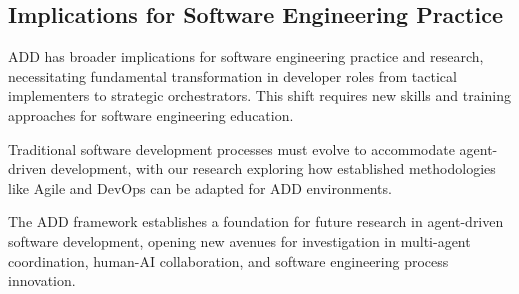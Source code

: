 \subsection{Implications for Software Engineering Practice}

ADD has broader implications for software engineering practice and research, necessitating fundamental transformation in developer roles from tactical implementers to strategic orchestrators. This shift requires new skills and training approaches for software engineering education.

Traditional software development processes must evolve to accommodate agent-driven development, with our research exploring how established methodologies like Agile and DevOps can be adapted for ADD environments.

The ADD framework establishes a foundation for future research in agent-driven software development, opening new avenues for investigation in multi-agent coordination, human-AI collaboration, and software engineering process innovation.
